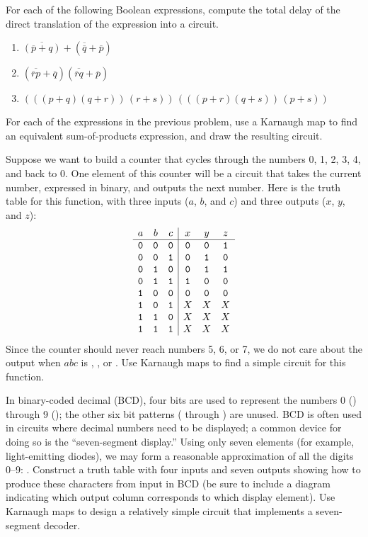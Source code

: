 \begin{exercises}
\item For each of the following Boolean expressions, compute the total delay of the direct translation of the expression into a circuit.
\begin{enumerate}
\item $\overline{(\overline{p}+q)}+(\overline{\overline{q}}+\overline{p})$
\item $(\overline{\overline{r}p}+\overline{q})(\overline{\overline{r}q}+\overline{p})$
\item $(((p+q)(q+r))\,(r+s))\,(((p+r)(q+s))\,(p+s))$
\end{enumerate}

\item For each of the expressions in the previous problem, use a Karnaugh map to find an equivalent sum-of-products expression, and draw the resulting circuit.

\item Suppose we want to build a counter that cycles through the numbers 0, 1, 2, 3, 4, and back to 0. One element of this counter will be a circuit that takes the current number, expressed in binary, and outputs the next number. Here is the truth table for this function, with three inputs ($a$, $b$, and $c$) and three outputs ($x$, $y$, and $z$):
\[ \begin{array}{ccc|ccc}
a & b & c & x & y & z\\ \hline
\mathtt{0} & \mathtt{0} & \mathtt{0} & \mathtt{0} & \mathtt{0} & \mathtt{1}\\
\mathtt{0} & \mathtt{0} & \mathtt{1} & \mathtt{0} & \mathtt{1} & \mathtt{0}\\
\mathtt{0} & \mathtt{1} & \mathtt{0} & \mathtt{0} & \mathtt{1} & \mathtt{1}\\
\mathtt{0} & \mathtt{1} & \mathtt{1} & \mathtt{1} & \mathtt{0} & \mathtt{0}\\
\mathtt{1} & \mathtt{0} & \mathtt{0} & \mathtt{0} & \mathtt{0} & \mathtt{0}\\
\mathtt{1} & \mathtt{0} & \mathtt{1} & X & X & X\\
\mathtt{1} & \mathtt{1} & \mathtt{0} & X & X & X\\
\mathtt{1} & \mathtt{1} & \mathtt{1} & X & X & X\\
\end{array} \]
Since the counter should never reach numbers 5, 6, or 7, we do not care about the output when $abc$ is \1\0\1, \1\1\0, or \1\1\1. Use Karnaugh maps to find a simple circuit for this function.

\item\label{ex:BCD} In binary-coded decimal (BCD), four bits are used to represent the numbers 0 (\0\0\0\0) through 9 (\1\0\0\1); the other six bit patterns (\1\0\1\0 through \1\1\1\1) are unused. BCD is often used in circuits where decimal numbers need to be displayed; a common device for doing so is the ``seven-segment display.'' Using only seven elements (for example, light-emitting diodes), we may form a reasonable approximation of all the digits 0--9: . Construct a truth table with four inputs and seven outputs showing how to produce these characters from input in BCD (be sure to include a diagram indicating which output column corresponds to which display element). Use Karnaugh maps to design a relatively simple circuit that implements a seven-segment decoder.


\end{exercises}
